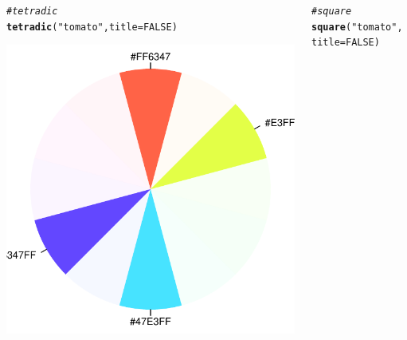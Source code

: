 \documentclass[12pt]{beamer}\usepackage[]{graphicx}\usepackage[]{color}
\makeatletter
\newcommand{\hlnum}[1]{\textcolor[rgb]{0.686,0.059,0.569}{#1}}%
\newcommand{\hlstr}[1]{\textcolor[rgb]{0.192,0.494,0.8}{#1}}%
\newcommand{\hlcom}[1]{\textcolor[rgb]{0.678,0.584,0.686}{\textit{#1}}}%
\newcommand{\hlstd}[1]{\textcolor[rgb]{0.345,0.345,0.345}{#1}}%
\newcommand{\hlkwc}[1]{\textcolor[rgb]{0.333,0.667,0.333}{#1}}%
\newcommand{\hlkwd}[1]{\textcolor[rgb]{0.737,0.353,0.396}{\textbf{#1}}}%
\newenvironment{kframe}{%
 \def\at@end@of@kframe{}%
 \ifinner\ifhmode%
  \def\at@end@of@kframe{\end{minipage}}%
  \begin{minipage}{\columnwidth}%
 \fi\fi%
 \def\FrameCommand##1{\hskip\@totalleftmargin \hskip-\fboxsep
 \colorbox{shadecolor}{##1}\hskip-\fboxsep
     \hskip-\linewidth \hskip-\@totalleftmargin \hskip\columnwidth}%
 \MakeFramed {\advance\hsize-\width
   \@totalleftmargin\z@ \linewidth\hsize
   \@setminipage}}%
 {\par\unskip\endMakeFramed%
 \at@end@of@kframe}
\newenvironment{knitrout}{}{} %
\makeatother
\begin{document}
\begin{frame}[fragile]
\begin{columns}[t]
\begin{column}{0.5\textwidth}
\begin{knitrout}
{}



\end{knitrout}
\end{column}
\end{columns}

\end{frame}


\begin{frame}[fragile]

\begin{columns}[t]
\begin{column}{0.5\textwidth}
\begin{knitrout}\tiny
{}\color{fgcolor}\begin{kframe}
\begin{alltt}
\hlcom{# tetradic}
\hlkwd{tetradic}\hlstd{(}\hlstr{"tomato"}\hlstd{,} \hlkwc{title} \hlstd{=} \hlnum{FALSE}\hlstd{)}
\end{alltt}
\end{kframe}

{\centering \includegraphics[width=.6\linewidth,height=.6\linewidth]{figure/tomato_tetradic-1} 

}



\end{knitrout}
\end{column}

\begin{column}{0.5\textwidth}
\begin{knitrout}\tiny
{}\color{fgcolor}\begin{kframe}
\begin{alltt}
\hlcom{# square}
\hlkwd{square}\hlstd{(}\hlstr{"tomato"}\hlstd{,} \hlkwc{title} \hlstd{=} \hlnum{FALSE}\hlstd{)}
\end{alltt}
\end{kframe}


\end{knitrout}
\end{column}
\end{columns}
\end{frame}
\end{document}
